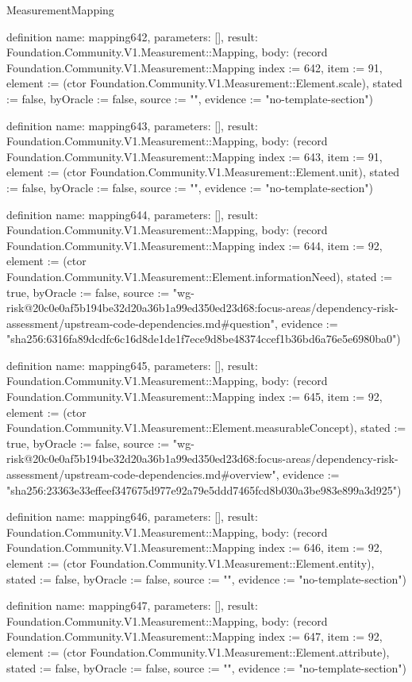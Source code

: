\begin{lexlean}{MeasurementMapping}
\begin{semanticmodule}
definition{
  name: mapping642,
  parameters: [],
  result: Foundation.Community.V1.Measurement::Mapping,
  body: (record Foundation.Community.V1.Measurement::Mapping {index := 642, item := 91, element := (ctor Foundation.Community.V1.Measurement::Element.scale), stated := false, byOracle := false, source := "", evidence := "no-template-section"})
}

definition{
  name: mapping643,
  parameters: [],
  result: Foundation.Community.V1.Measurement::Mapping,
  body: (record Foundation.Community.V1.Measurement::Mapping {index := 643, item := 91, element := (ctor Foundation.Community.V1.Measurement::Element.unit), stated := false, byOracle := false, source := "", evidence := "no-template-section"})
}

definition{
  name: mapping644,
  parameters: [],
  result: Foundation.Community.V1.Measurement::Mapping,
  body: (record Foundation.Community.V1.Measurement::Mapping {index := 644, item := 92, element := (ctor Foundation.Community.V1.Measurement::Element.informationNeed), stated := true, byOracle := false, source := "wg-risk@20c0e0af5b194be32d20a36b1a99ed350ed23d68:focus-areas/dependency-risk-assessment/upstream-code-dependencies.md#question", evidence := "sha256:6316fa89dcdfc6c16d8de1de1f7ece9d8be48374ccef1b36bd6a76e5e6980ba0"})
}

definition{
  name: mapping645,
  parameters: [],
  result: Foundation.Community.V1.Measurement::Mapping,
  body: (record Foundation.Community.V1.Measurement::Mapping {index := 645, item := 92, element := (ctor Foundation.Community.V1.Measurement::Element.measurableConcept), stated := true, byOracle := false, source := "wg-risk@20c0e0af5b194be32d20a36b1a99ed350ed23d68:focus-areas/dependency-risk-assessment/upstream-code-dependencies.md#overview", evidence := "sha256:23363e33effeef347675d977e92a79e5ddd7465fcd8b030a3be983e899a3d925"})
}

definition{
  name: mapping646,
  parameters: [],
  result: Foundation.Community.V1.Measurement::Mapping,
  body: (record Foundation.Community.V1.Measurement::Mapping {index := 646, item := 92, element := (ctor Foundation.Community.V1.Measurement::Element.entity), stated := false, byOracle := false, source := "", evidence := "no-template-section"})
}

definition{
  name: mapping647,
  parameters: [],
  result: Foundation.Community.V1.Measurement::Mapping,
  body: (record Foundation.Community.V1.Measurement::Mapping {index := 647, item := 92, element := (ctor Foundation.Community.V1.Measurement::Element.attribute), stated := false, byOracle := false, source := "", evidence := "no-template-section"})
}


\end{semanticmodule}
\end{lexlean}
